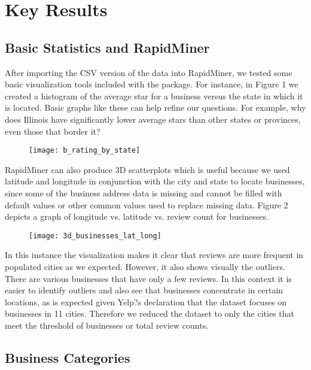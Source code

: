\section{Key Results}

\subsection{Basic Statistics and RapidMiner}

\quad After importing the CSV version of the data into RapidMiner, we tested some basic visualization tools included with the package. For instance, in Figure 1 we created a histogram of the average star for a business versus the state in which it is located. Basic graphs like these can help refine our questions. For example, why does Illinois have significantly lower average stars than other states or provinces, even those that border it?

\begin{figure}[h]
\texttt{[image: b\_rating\_by\_state]}
\end{figure}

\quad RapidMiner can also produce 3D scatterplots which is useful because we used latitude and longitude in conjunction with the city and state to locate businesses, since some of the business address data is missing and cannot be filled with default values or other common values used to replace missing data. Figure 2 depicts a graph of longitude vs. latitude vs. review count for businesses.

\begin{figure}[!h]
\texttt{[image: 3d\_businesses\_lat\_long]}
\end{figure}

\quad In this instance the visualization makes it clear that reviews are more frequent in populated cities as we expected. However, it also shows visually the outliers. There are various businesses that have only a few reviews. In this context it is easier to identify outliers and also see that businesses concentrate in certain locations, as is expected given Yelp?s declaration that the dataset focuses on businesses in 11 cities. Therefore we reduced the dataset to only the cities that meet the threshold of businesses or total review counts.

\subsection{Business Categories}

